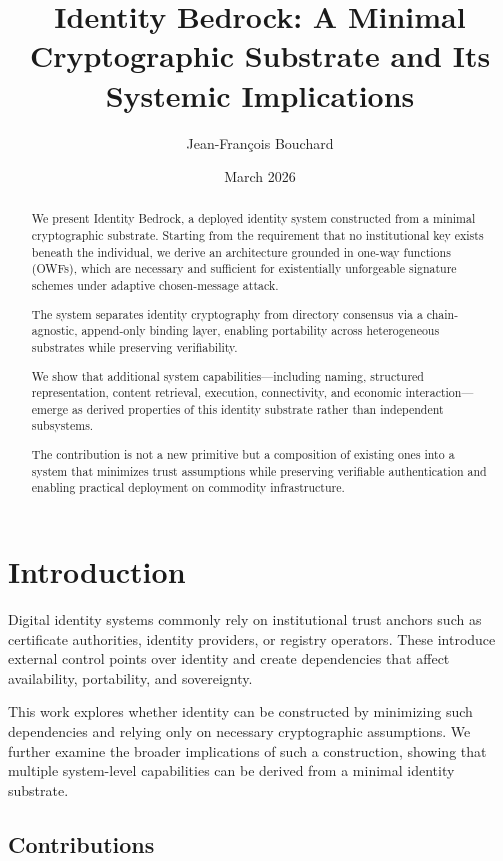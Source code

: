 \documentclass[11pt,a4paper]{article}
\title{\textbf{Identity Bedrock: A Minimal Cryptographic Substrate and Its Systemic Implications}}
\author{Jean-François Bouchard}
\date{March 2026}
\begin{document}
\maketitle

\begin{abstract}
We present Identity Bedrock, a deployed identity system constructed from a minimal cryptographic substrate. Starting from the requirement that no institutional key exists beneath the individual, we derive an architecture grounded in one-way functions (OWFs), which are necessary and sufficient for existentially unforgeable signature schemes under adaptive chosen-message attack.

The system separates identity cryptography from directory consensus via a chain-agnostic, append-only binding layer, enabling portability across heterogeneous substrates while preserving verifiability.

We show that additional system capabilities---including naming, structured representation, content retrieval, execution, connectivity, and economic interaction---emerge as derived properties of this identity substrate rather than independent subsystems.

The contribution is not a new primitive but a composition of existing ones into a system that minimizes trust assumptions while preserving verifiable authentication and enabling practical deployment on commodity infrastructure.
\end{abstract}

\section{Introduction}

Digital identity systems commonly rely on institutional trust anchors such as certificate authorities, identity providers, or registry operators. These introduce external control points over identity and create dependencies that affect availability, portability, and sovereignty.

This work explores whether identity can be constructed by minimizing such dependencies and relying only on necessary cryptographic assumptions. We further examine the broader implications of such a construction, showing that multiple system-level capabilities can be derived from a minimal identity substrate.

\subsection{Contributions}
\end{document}
